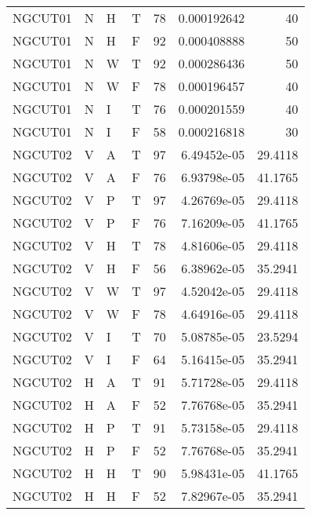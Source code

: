 \begin{longtable}{llllrrr}
    NGCUT01  & N     & H     & T          & 78         & 0.000192642 & 40       \\
    NGCUT01  & N     & H     & F          & 92         & 0.000408888 & 50       \\
    NGCUT01  & N     & W     & T          & 92         & 0.000286436 & 50       \\
    NGCUT01  & N     & W     & F          & 78         & 0.000196457 & 40       \\
    NGCUT01  & N     & I     & T          & 76         & 0.000201559 & 40       \\
    NGCUT01  & N     & I     & F          & 58         & 0.000216818 & 30       \\
    NGCUT02  & V     & A     & T          & 97         & 6.49452e-05 & 29.4118  \\
    NGCUT02  & V     & A     & F          & 76         & 6.93798e-05 & 41.1765  \\
    NGCUT02  & V     & P     & T          & 97         & 4.26769e-05 & 29.4118  \\
    NGCUT02  & V     & P     & F          & 76         & 7.16209e-05 & 41.1765  \\
    NGCUT02  & V     & H     & T          & 78         & 4.81606e-05 & 29.4118  \\
    NGCUT02  & V     & H     & F          & 56         & 6.38962e-05 & 35.2941  \\
    NGCUT02  & V     & W     & T          & 97         & 4.52042e-05 & 29.4118  \\
    NGCUT02  & V     & W     & F          & 78         & 4.64916e-05 & 29.4118  \\
    NGCUT02  & V     & I     & T          & 70         & 5.08785e-05 & 23.5294  \\
    NGCUT02  & V     & I     & F          & 64         & 5.16415e-05 & 35.2941  \\
    NGCUT02  & H     & A     & T          & 91         & 5.71728e-05 & 29.4118  \\
    NGCUT02  & H     & A     & F          & 52         & 7.76768e-05 & 35.2941  \\
    NGCUT02  & H     & P     & T          & 91         & 5.73158e-05 & 29.4118  \\
    NGCUT02  & H     & P     & F          & 52         & 7.76768e-05 & 35.2941  \\
    NGCUT02  & H     & H     & T          & 90         & 5.98431e-05 & 41.1765  \\
    NGCUT02  & H     & H     & F          & 52         & 7.82967e-05 & 35.2941  \\

\end{longtable}
